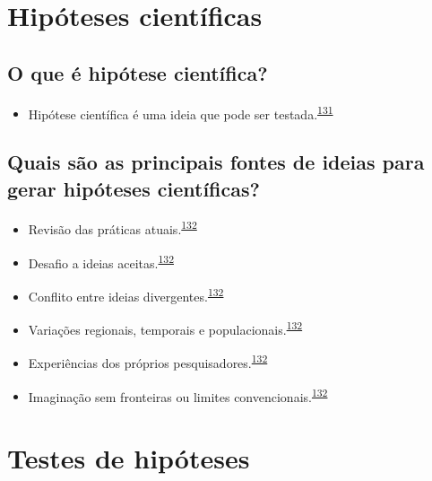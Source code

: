 \documentclass[
]{book}
\providecommand{\tightlist}{%
  \setlength{\itemsep}{0pt}\setlength{\parskip}{0pt}}
\begin{document}
\hypertarget{ideias-hipoteses}{%
\section{Hipóteses científicas}\label{ideias-hipoteses}}

\hypertarget{o-que-uxe9-hipuxf3tese-cientuxedfica}{%
\subsection{O que é hipótese científica?}\label{o-que-uxe9-hipuxf3tese-cientuxedfica}}

\begin{itemize}
\tightlist
\item
  Hipótese científica é uma ideia que pode ser testada.\textsuperscript{\protect\hyperlink{ref-Curran-Everett2009}{131}}
\end{itemize}

\hypertarget{quais-suxe3o-as-principais-fontes-de-ideias-para-gerar-hipuxf3teses-cientuxedficas}{%
\subsection{Quais são as principais fontes de ideias para gerar hipóteses científicas?}\label{quais-suxe3o-as-principais-fontes-de-ideias-para-gerar-hipuxf3teses-cientuxedficas}}

\begin{itemize}
\item
  Revisão das práticas atuais.\textsuperscript{\protect\hyperlink{ref-Vandenbroucke2018}{132}}
\item
  Desafio a ideias aceitas.\textsuperscript{\protect\hyperlink{ref-Vandenbroucke2018}{132}}
\item
  Conflito entre ideias divergentes.\textsuperscript{\protect\hyperlink{ref-Vandenbroucke2018}{132}}
\item
  Variações regionais, temporais e populacionais.\textsuperscript{\protect\hyperlink{ref-Vandenbroucke2018}{132}}
\item
  Experiências dos próprios pesquisadores.\textsuperscript{\protect\hyperlink{ref-Vandenbroucke2018}{132}}
\item
  Imaginação sem fronteiras ou limites convencionais.\textsuperscript{\protect\hyperlink{ref-Vandenbroucke2018}{132}}
\end{itemize}

\hypertarget{erros-inferencia}{%
\section{Testes de hipóteses}\label{erros-inferencia}}
\end{document}
